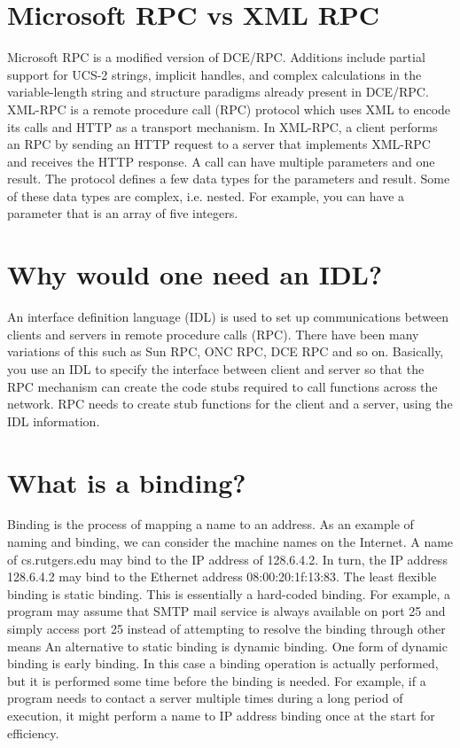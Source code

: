 \documentclass[11pt]{article}
\begin{document}
\section{Microsoft RPC vs XML RPC}
\label{sec:org7d1a55e}
Microsoft RPC is a modified version of DCE/RPC. Additions include partial support for UCS-2 strings, implicit handles, and complex calculations in the variable-length string and structure paradigms already present in DCE/RPC.
XML-RPC is a remote procedure call (RPC) protocol which uses XML to encode its calls and HTTP as a transport mechanism. In XML-RPC, a client performs an RPC by sending an HTTP request to a server that implements XML-RPC and receives the HTTP response. A call can have multiple parameters and one result. The protocol defines a few data types for the parameters and result. Some of these data types are complex, i.e. nested. For example, you can have a parameter that is an array of five integers.

\section{Why would one need an IDL?}
\label{sec:orgb571c3a}
An interface definition language (IDL) is used to set up communications between clients and servers in remote procedure calls (RPC). There have been many variations of this such as Sun RPC, ONC RPC, DCE RPC and so on.
Basically, you use an IDL to specify the interface between client and server so that the RPC mechanism can create the code stubs required to call functions across the network.
RPC needs to create stub functions for the client and a server, using the IDL information.

\section{What is a binding?}
\label{sec:org3135392}
Binding is the process of mapping a name to an address.
As an example of naming and binding, we can consider the machine names on the Internet. A name of cs.rutgers.edu may bind to the IP address of 128.6.4.2. In turn, the IP address 128.6.4.2 may bind to the Ethernet address 08:00:20:1f:13:83.
The least flexible binding is static binding. This is essentially a hard-coded binding. For example, a program may assume that SMTP mail service is always available on port 25 and simply access port 25 instead of attempting to resolve the binding through other means
An alternative to static binding is dynamic binding.
One form of dynamic binding is early binding. In this case a binding operation is actually performed, but it is performed some time before the binding is needed. For example, if a program needs to contact a server multiple times during a long period of execution, it might perform a name to IP address binding once at the start for efficiency.
\end{document}
